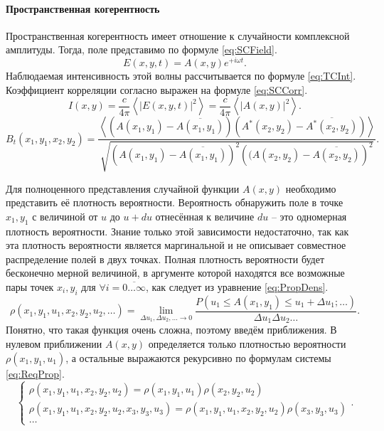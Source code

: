 \paragraph{Пространственная когерентность}\label{par:SpatialIncoherence}
Пространственная когерентность имеет отношение к случайности комплексной амплитуды. Тогда, поле представимо по формуле \ref{eq:SCField}.
\begin{equation}\label{eq:SCField}
	E(x,y,t) = A(x,y)e^{+i{\omega}t}.
\end{equation}
Наблюдаемая интенсивность этой волны рассчитывается по формуле \ref{eq:TCInt}. Коэффициент корреляции согласно \cite{Ahmanov} выражен на формуле \ref{eq:SCCorr}.
\begin{equation}\label{eq:TCInt}
	I(x,y) = \frac{c}{4\pi}\left<\left|E(x,y,t)\right|^2\right> = \frac{c}{4\pi}\left<\left|A(x,y)\right|^2\right>.
\end{equation}
\begin{equation}\label{eq:SCCorr}
	B_t(x_1,y_1,x_2,y_2)=\frac
	{\left<\left(A(x_1,y_1) - \overline{A(x_1,y_1)}\right)\left(A^*(x_2,y_2) - \overline{A^*(x_2,y_2)}\right)\right>}
	{\sqrt{\left(A(x_1,y_1) - \overline{A(x_1,y_1)}\right)^2\left((A(x_2,y_2) - \overline{A(x_2,y_2)}\right)^2}}.
\end{equation}
\par
Для полноценного представления случайной функции $A(x,y)$ необходимо представить её плотность вероятности. Вероятность обнаружить поле в точке $x_1,y_1$ с величиной от $u$ до $u+du$ отнесённая к величине $du$ -- это одномерная плотность вероятности. Знание только этой зависимости недостаточно, так как эта плотность вероятности является маргинальной и не описывает совместное распределение полей в двух точках. Полная плотность вероятности будет бесконечно мерной величиной, в аргументе которой находятся все возможные пары точек $x_i,y_i$ для $\forall i = \overline{0 \dots \infty}$, как следует из уравнение \ref{eq:PropDens}.
\begin{equation}\label{eq:PropDens}
	\rho(x_1,y_1,u_1,x_2,y_2,u_2,\dots) = \lim\limits_{\Delta u_1, \Delta u_2, \dots \rightarrow 0}\frac
	{P\left(u_1 \le A(x_1,y_1) \le u_1 + \Delta u_1; \dots\right)}
	{\Delta u_1 \Delta u_2 \dots}.
\end{equation}
Понятно, что такая функция очень сложна, поэтому введём приближения. В нулевом приближении $A(x,y)$ определяется только плотностью вероятности $\rho(x_1,y_1,u_1)$, а остальные выражаются рекурсивно по формулам системы \ref{eq:ReqProp}.
\begin{equation}\label{eq:ReqProp}
	\begin{cases}
		\rho(x_1,y_1,u_1,x_2,y_2,u_2) = \rho(x_1,y_1,u_1) \rho(x_2,y_2,u_2) \\
		\rho(x_1,y_1,u_1,x_2,y_2,u_2,x_3,y_3,u_3) =  \rho(x_1,y_1,u_1,x_2,y_2,u_2) \rho(x_3,y_3,u_3) \\
		\dots
	\end{cases}.
\end{equation}
